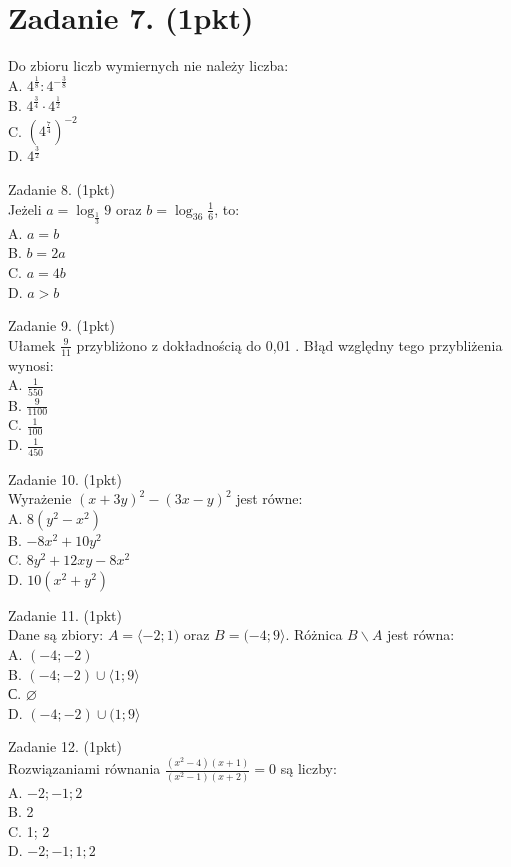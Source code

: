 \documentclass[10pt]{article}
\begin{document}
\section*{Zadanie 7. (1pkt)}
Do zbioru liczb wymiernych nie należy liczba:\\
A. \(4^{\frac{1}{8}}: 4^{-\frac{3}{8}}\)\\
B. \(4^{\frac{3}{4}} \cdot 4^{\frac{1}{2}}\)\\
C. \(\left(4^{\frac{7}{4}}\right)^{-2}\)\\
D. \(4^{\frac{3}{2}}\)

Zadanie 8. (1pkt)\\
Jeżeli \(a=\log _{\frac{1}{3}} 9\) oraz \(b=\log _{36} \frac{1}{6}\), to:\\
A. \(a=b\)\\
B. \(b=2 a\)\\
C. \(a=4 b\)\\
D. \(a>b\)

Zadanie 9. (1pkt)\\
Ułamek \(\frac{9}{11}\) przybliżono z dokładnością do 0,01 . Błąd względny tego przybliżenia wynosi:\\
A. \(\frac{1}{550}\)\\
B. \(\frac{9}{1100}\)\\
C. \(\frac{1}{100}\)\\
D. \(\frac{1}{450}\)

Zadanie 10. (1pkt)\\
Wyrażenie \((x+3 y)^{2}-(3 x-y)^{2}\) jest równe:\\
A. \(8\left(y^{2}-x^{2}\right)\)\\
B. \(-8 x^{2}+10 y^{2}\)\\
C. \(8 y^{2}+12 x y-8 x^{2}\)\\
D. \(10\left(x^{2}+y^{2}\right)\)

Zadanie 11. (1pkt)\\
Dane są zbiory: \(A=\langle-2 ; 1)\) oraz \(B=(-4 ; 9\rangle\). Różnica \(B \backslash A\) jest równa:\\
A. \((-4 ;-2)\)\\
B. \((-4 ;-2) \cup\langle 1 ; 9\rangle\)\\
С. \(\varnothing\)\\
D. \((-4 ;-2) \cup(1 ; 9\rangle\)

Zadanie 12. (1pkt)\\
Rozwiązaniami równania \(\frac{\left(x^{2}-4\right)(x+1)}{\left(x^{2}-1\right)(x+2)}=0\) są liczby:\\
A. \(-2 ;-1 ; 2\)\\
B. 2\\
C. 1; 2\\
D. \(-2 ;-1 ; 1 ; 2\)
\end{document}

